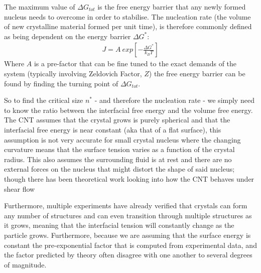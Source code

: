 The maximum value of $\Delta G_{tot}$ is the free energy barrier 
that any newly formed nucleus needs to overcome in order to stabilise.
The nucleation rate (the volume of new crystalline material formed per
unit time), is therefore commonly defined as being dependent on the 
energy barrier $\Delta G^*$:
\begin{align}
	J = A \ exp \left[-\frac{\Delta G^*}{k_BT} \right]
\end{align}
Where $A$ is a pre-factor that can be fine tuned to the exact demands
of the system (typically involving Zeldovich Factor, $Z$) the free 
energy barrier can be found by finding the turning point of $\Delta G_{tot}$. 

So to find the critical size $n^*$  - and therefore the nucleation rate - we simply need to know the ratio between the interfacial free energy and the volume free energy. The CNT assumes that the crystal grows is purely spherical and that the interfacial free energy is near constant (aka that of a flat surface), this assumption is not very accurate for small crystal nucleus where the changing curvature means that the surface tension varies as a function of the crystal radius. This also assumes the surrounding fluid is at rest and there are no external forces on the nucleus that might distort the shape of said nucleus; though there has been theoretical work looking into how the CNT behaves under shear flow \cite{Debuysschere2023, Mura2016, Richard2015}

Furthermore, multiple experiments have already verified that crystals can form any number of structures and can even transition through multiple structures as it grows, meaning that the interfacial tension will constantly change as the particle grows. Furthermore, because we are assuming that the surface energy is constant the pre-exponential factor that is computed from experimental data, and the factor predicted by theory often disagree with one another to several degrees of magnitude. 

